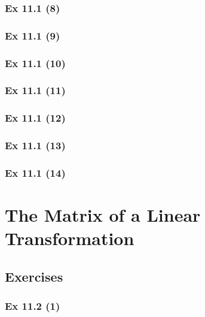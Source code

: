 \subsubsection{Ex 11.1 (8)}\label{sec:Ex_11.1.8}

\subsubsection{Ex 11.1 (9)}\label{sec:Ex_11.1.9}

\subsubsection{Ex 11.1 (10)}\label{sec:Ex_11.1.10}

\newpage		%

\subsubsection{Ex 11.1 (11)}\label{sec:Ex_11.1.11}

\subsubsection{Ex 11.1 (12)}\label{sec:Ex_11.1.12}

\subsubsection{Ex 11.1 (13)}\label{sec:Ex_11.1.13}

\subsubsection{Ex 11.1 (14)}\label{sec:Ex_11.1.14}

\newpage		%

\section{The Matrix of a Linear Transformation}\label{sec:11.2}	
\subsection*{Exercises}\label{sec:11.2_Exercises}

\subsubsection{Ex 11.2 (1)}\label{sec:Ex_11.2.1}


